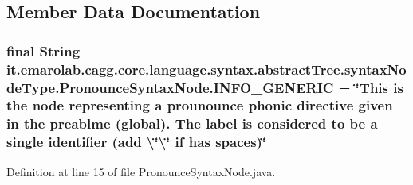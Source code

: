 \subsection{Member Data Documentation}
\hypertarget{classit_1_1emarolab_1_1cagg_1_1core_1_1language_1_1syntax_1_1abstractTree_1_1syntaxNodeType_1_1PronounceSyntaxNode_a3344aa57e56babfc6981dea0a04d538f}{
\subsubsection[{I\-N\-F\-O\-\_\-\-G\-E\-N\-E\-R\-I\-C}]{\setlength{\rightskip}{0pt plus 5cm}final String it.\-emarolab.\-cagg.\-core.\-language.\-syntax.\-abstract\-Tree.\-syntax\-Node\-Type.\-Pronounce\-Syntax\-Node.\-I\-N\-F\-O\-\_\-\-G\-E\-N\-E\-R\-I\-C = \char`\"{}This is the node representing a prounounce phonic directive given in the preablme (global). The label is considered to be a single identifier (add \textbackslash{}\char`\"{}\textbackslash{}\char`\"{} if has spaces)\char`\"{}\hspace{0.3cm}{\ttfamily [static]}}}\label{classit_1_1emarolab_1_1cagg_1_1core_1_1language_1_1syntax_1_1abstractTree_1_1syntaxNodeType_1_1PronounceSyntaxNode_a3344aa57e56babfc6981dea0a04d538f}


Definition at line 15 of file Pronounce\-Syntax\-Node.\-java.

